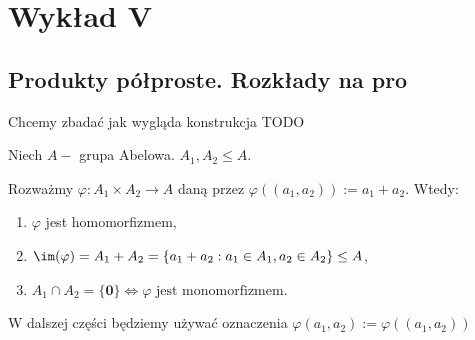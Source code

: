 \chapter{Wykład V}

\section{Produkty półproste. Rozkłady na pro}
\begin{context}

Chcemy zbadać jak wygląda konstrukcja TODO	
\end{context}
\begin{fact}

Niech $A-$ grupa Abelowa. $A_1, A_2 \le A$. 

Rozważmy $\varphi : A_1\times A_2 \rightarrow A$ daną przez $\varphi((a_1,a_2)) := a_1 + a_2$. Wtedy:
	\begin{enumerate}[label=\roman*)]
		\item $\varphi$ jest homomorfizmem,
		\item $\im(\varphi) = A_1 + A_2 = \{a_1+a_2: a_1 \in A_1, a_2\in A_2\} \le A$,
		\item $A_1 \cap A_2 = \{\mathbf{0}\} \iff \varphi \text{ jest monomorfizmem.}$
	\end{enumerate}

W dalszej części będziemy używać oznaczenia $\varphi(a_1,a_2) := \varphi((a_1,a_2))$
\end{fact}
